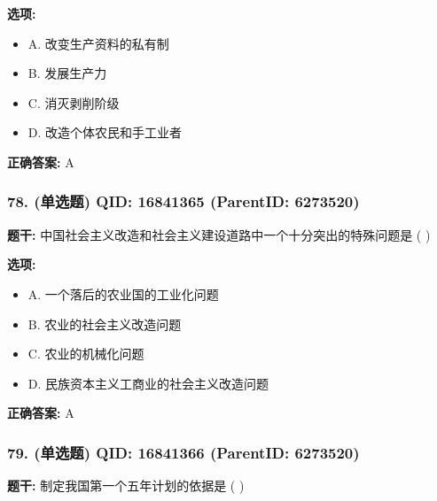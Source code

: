 \documentclass[12pt,UTF8]{ctexart}
\begin{document}
\textbf{选项:}
\begin{itemize}[leftmargin=*]

  \item A. 改变生产资料的私有制

  \item B. 发展生产力

  \item C. 消灭剥削阶级

  \item D. 改造个体农民和手工业者

\end{itemize}

\textbf{正确答案:}
A

\vspace{0.3em}\hrulefill\vspace{0.7em}

\subsubsection*{78. (单选题) \small QID: 16841365 (ParentID: 6273520)}

\textbf{题干:}
中国社会主义改造和社会主义建设道路中一个十分突出的特殊问题是 ( )



\textbf{选项:}
\begin{itemize}[leftmargin=*]

  \item A. 一个落后的农业国的工业化问题

  \item B. 农业的社会主义改造问题

  \item C. 农业的机械化问题

  \item D. 民族资本主义工商业的社会主义改造问题

\end{itemize}

\textbf{正确答案:}
A

\vspace{0.3em}\hrulefill\vspace{0.7em}

\subsubsection*{79. (单选题) \small QID: 16841366 (ParentID: 6273520)}

\textbf{题干:}
制定我国第一个五年计划的依据是 ( )
\end{document}
